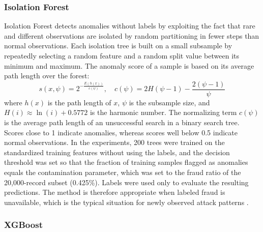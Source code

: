 \documentclass[conference]{IEEEtran}
\begin{document}
\subsubsection{Isolation Forest}

Isolation Forest \cite{liu2008isolation} detects anomalies without labels by exploiting the fact that rare and different observations are isolated by random partitioning in fewer steps than normal observations. Each isolation tree is built on a small subsample by repeatedly selecting a random feature and a random split value between its minimum and maximum. The anomaly score of a sample is based on its average path length over the forest:
\begin{equation}
    s(x, \psi) = 2^{-\frac{E(h(x))}{c(\psi)}}, \quad c(\psi) = 2H(\psi-1) - \frac{2(\psi-1)}{\psi}
\end{equation}
where $h(x)$ is the path length of $x$, $\psi$ is the subsample size, and $H(i)\approx\ln(i)+0.5772$ is the harmonic number. The normalizing term $c(\psi)$ is the average path length of an unsuccessful search in a binary search tree. Scores close to 1 indicate anomalies, whereas scores well below 0.5 indicate normal observations. In the experiments, 200 trees were trained on the standardized training features without using the labels, and the decision threshold was set so that the fraction of training samples flagged as anomalies equals the contamination parameter, which was set to the fraud ratio of the 20,000-record subset (0.425\%). Labels were used only to evaluate the resulting predictions. The method is therefore appropriate when labeled fraud is unavailable, which is the typical situation for newly observed attack patterns \cite{bolton2002statistical}.

\subsubsection{XGBoost}
\end{document}
